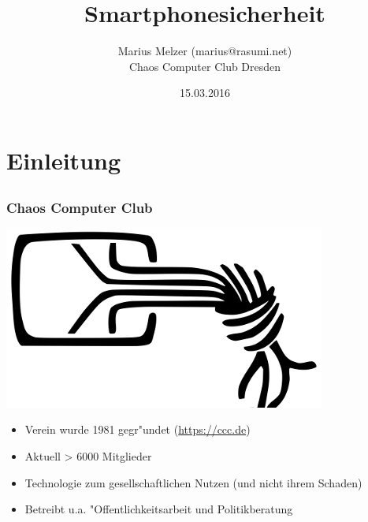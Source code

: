 \documentclass[12pt, xcolor={svgnames,table}]{beamer}
\title{Smartphonesicherheit}
\author{\small Marius Melzer (marius@rasumi.net) \\\large Chaos Computer Club Dresden}
\date{15.03.2016}
\begin{document}
\maketitle

\section{Einleitung}
\subsection{}

\begin{frame}
    \frametitle{Chaos Computer Club}
    \begin{center}
	\includegraphics[height=0.2\textheight]{img/chaosknoten.png}
    \end{center}	
    \begin{itemize}
      \item<1-> Verein wurde 1981 gegr"undet (\url{https://ccc.de})
      \item<2-> Aktuell > 6000 Mitglieder
      \item<3-> Technologie zum gesellschaftlichen Nutzen (und nicht ihrem Schaden)
      \item<4-> Betreibt u.a. "Offentlichkeitsarbeit und Politikberatung
    \end{itemize}
\end{frame}
\end{document}
